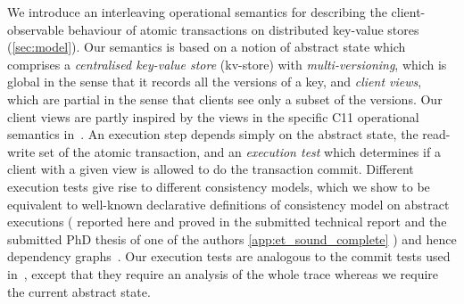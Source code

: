 










We introduce an  {interleaving} operational semantics for
describing the client-observable behaviour of atomic transactions on
distributed key-value stores (\cref{sec:model}). Our semantics is
based on a notion of abstract state which 
comprises a  \emph{ centralised key-value store} (kv-store) with
\emph{multi-versioning}, which is {global} in the sense that it
records all the versions of a key, and
\emph{client views}, which are {partial} in the sense that  clients see only a subset of the
versions. Our client views are partly inspired by the views in the specific C11
operational semantics in~\cite{promises}.   An execution step
 depends
simply on the abstract state, the read-write set of the atomic transaction, and an \emph{execution test} which
determines if a client with a given view is allowed to do the
transaction commit. Different execution tests give rise to different consistency models, 
which we show to be equivalent to well-known
declarative definitions of consistency model on abstract executions (%
\ifTechRepEdits%
reported here and proved in the submitted  technical report and the
submitted 
PhD thesis of one of the authors%
\else%
\cref{app:et_sound_complete}%
\fi%
) and hence dependency graphs~\cite{andreaandalexeysworkshowingequivaneces}. 
Our execution tests are analogous to the commit tests used  in~\cite{seebelieve},
except that they require an analysis of the whole trace whereas we require the current abstract state. 




